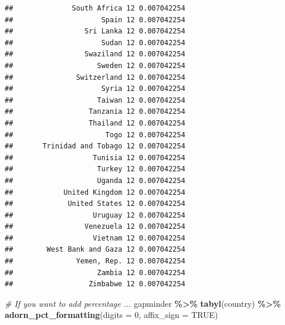 \documentclass[
]{book}
\newenvironment{Shaded}{\begin{snugshade}}{\end{snugshade}}
\newcommand{\AttributeTok}[1]{\textcolor[rgb]{0.13,0.29,0.53}{#1}}
\newcommand{\CommentTok}[1]{\textcolor[rgb]{0.56,0.35,0.01}{\textit{#1}}}
\newcommand{\ConstantTok}[1]{\textcolor[rgb]{0.56,0.35,0.01}{#1}}
\newcommand{\DecValTok}[1]{\textcolor[rgb]{0.00,0.00,0.81}{#1}}
\newcommand{\FunctionTok}[1]{\textcolor[rgb]{0.13,0.29,0.53}{\textbf{#1}}}
\newcommand{\NormalTok}[1]{#1}
\newcommand{\SpecialCharTok}[1]{\textcolor[rgb]{0.81,0.36,0.00}{\textbf{#1}}}
\begin{document}
\begin{verbatim}
##              South Africa 12 0.007042254
##                     Spain 12 0.007042254
##                 Sri Lanka 12 0.007042254
##                     Sudan 12 0.007042254
##                 Swaziland 12 0.007042254
##                    Sweden 12 0.007042254
##               Switzerland 12 0.007042254
##                     Syria 12 0.007042254
##                    Taiwan 12 0.007042254
##                  Tanzania 12 0.007042254
##                  Thailand 12 0.007042254
##                      Togo 12 0.007042254
##       Trinidad and Tobago 12 0.007042254
##                   Tunisia 12 0.007042254
##                    Turkey 12 0.007042254
##                    Uganda 12 0.007042254
##            United Kingdom 12 0.007042254
##             United States 12 0.007042254
##                   Uruguay 12 0.007042254
##                 Venezuela 12 0.007042254
##                   Vietnam 12 0.007042254
##        West Bank and Gaza 12 0.007042254
##               Yemen, Rep. 12 0.007042254
##                    Zambia 12 0.007042254
##                  Zimbabwe 12 0.007042254
\end{verbatim}

\begin{Shaded}
\begin{Highlighting}[]
\CommentTok{\# If you want to add percentage ...}
\NormalTok{gapminder }\SpecialCharTok{\%\textgreater{}\%}
  \FunctionTok{tabyl}\NormalTok{(country) }\SpecialCharTok{\%\textgreater{}\%}
  \FunctionTok{adorn\_pct\_formatting}\NormalTok{(}\AttributeTok{digits =} \DecValTok{0}\NormalTok{, }\AttributeTok{affix\_sign =} \ConstantTok{TRUE}\NormalTok{)}
\end{Highlighting}
\end{Shaded}
\end{document}
